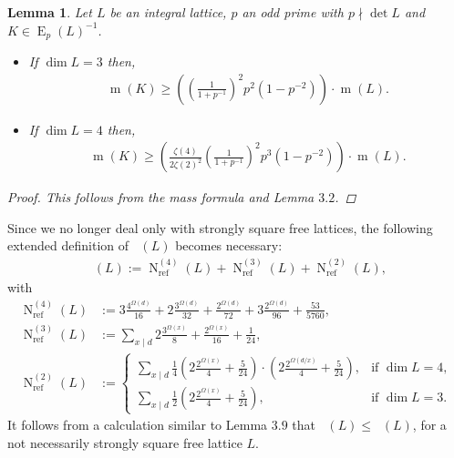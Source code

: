 \documentclass{amsart}
\newtheorem{lem}[thm]{Lemma}
\theoremstyle{definition}
\theoremstyle{remark}
\DeclareMathOperator{\m}{m}
\DeclareMathOperator{\mref}{m_{ref}}
\DeclareMathOperator{\N}{N}
\DeclareMathOperator{\Nref}{N_{ref}}
\DeclareMathOperator{\E}{E}
\begin{document}
\begin{lem} Let $L$ be an integral lattice, $p$ an odd prime with $p \nmid \det L$ and $K \in \E_p(L)^{-1}$.
 \begin{itemize}
  \item[(a)] If $\dim L = 3$ then,       
             \begin{align*}
              \m(K) \geq \left(\left(\frac{1}{1+p^{-1}}\right)^2 p^2 \left(1-p^{-2}\right)\right) \cdot \m(L).
             \end{align*}             
  \item[(b)] If $\dim L = 4$ then,
             \begin{align*}
              \m(K) \geq \left( \frac{\zeta(4)}{2\zeta(2)^2} \left(\frac{1}{1+p^{-1}}\right)^2 p^3 \left(1-p^{-2}\right)\right) \cdot \m(L).
             \end{align*}
 \end{itemize}
 \begin{proof}
  This follows from the mass formula and Lemma $3.2$.
 \end{proof}
\end{lem}
Since we no longer deal only with strongly square free lattices, the following extended definition of $\Nref(L)$ becomes necessary:
\begin{align*}
 \Nref(L) := \N^{(4)}_{\mathrm{ref}}(L) + \N^{(3)}_{\mathrm{ref}}(L) + \N^{(2)}_{\mathrm{ref}}(L),
\end{align*}
with
\begin{align*}
 \N^{(4)}_{\mathrm{ref}}(L) &:=3\frac{4^{\Omega(d)}}{16} + 2\frac{3^{\Omega(d)}}{32} + \frac{2^{\Omega(d)}}{72} + 3\frac{2^{\Omega(d)}}{96} + \frac{53}{5760},\\
 \N^{(3)}_{\mathrm{ref}}(L) &:=\sum_{x \mid d}2\frac{3^{\Omega(x)}}{8} + \frac{2^{\Omega(x)}}{16}+\frac{1}{24},\\
 \N^{(2)}_{\mathrm{ref}}(L) &:=
 \begin{cases}
  \sum_{x \mid d} \frac{1}{4} \left( 2\frac{2^{\Omega(x)}}{4} + \frac{5}{24} \right)\cdot \left( 2\frac{2^{\Omega(d/x)}}{4} + \frac{5}{24} \right), & \text{if $\dim L =4$},\\
  \sum_{x \mid d} \frac{1}{2} \left( 2\frac{2^{\Omega(x)}}{4} + \frac{5}{24} \right), & \text{if $\dim L =3$}.
 \end{cases}
\end{align*}
It follows from a calculation similar to Lemma $3.9$ that $\mref(L) \leq \Nref(L)$, for a not necessarily strongly square free lattice $L$.
\end{document}
